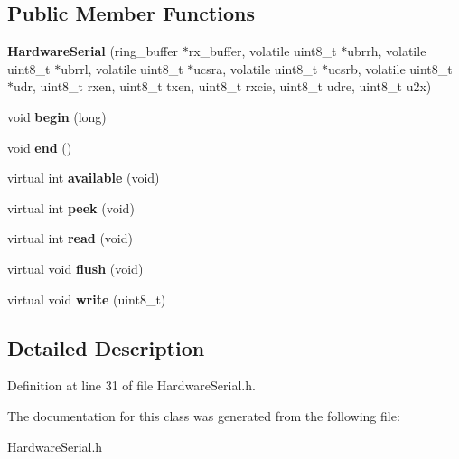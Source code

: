\subsection*{\-Public \-Member \-Functions}
\begin{DoxyCompactItemize}
\item 
\hypertarget{classHardwareSerial_adf3e7a7ac1006aeb934b506d502859b1}{
{\bfseries \-Hardware\-Serial} (ring\-\_\-buffer $\ast$rx\-\_\-buffer, volatile uint8\-\_\-t $\ast$ubrrh, volatile uint8\-\_\-t $\ast$ubrrl, volatile uint8\-\_\-t $\ast$ucsra, volatile uint8\-\_\-t $\ast$ucsrb, volatile uint8\-\_\-t $\ast$udr, uint8\-\_\-t rxen, uint8\-\_\-t txen, uint8\-\_\-t rxcie, uint8\-\_\-t udre, uint8\-\_\-t u2x)}
\label{classHardwareSerial_adf3e7a7ac1006aeb934b506d502859b1}

\item 
\hypertarget{classHardwareSerial_acea43a2b9c704ddf0a7c5f8b7859816c}{
void {\bfseries begin} (long)}
\label{classHardwareSerial_acea43a2b9c704ddf0a7c5f8b7859816c}

\item 
\hypertarget{classHardwareSerial_a0f86c41f580e04bdf30ea00e9014eacd}{
void {\bfseries end} ()}
\label{classHardwareSerial_a0f86c41f580e04bdf30ea00e9014eacd}

\item 
\hypertarget{classHardwareSerial_a60e2bb4a3f40cfaf94601cd4e3333f43}{
virtual int {\bfseries available} (void)}
\label{classHardwareSerial_a60e2bb4a3f40cfaf94601cd4e3333f43}

\item 
\hypertarget{classHardwareSerial_a69b3cfa7d35cc8102fe14e302034f194}{
virtual int {\bfseries peek} (void)}
\label{classHardwareSerial_a69b3cfa7d35cc8102fe14e302034f194}

\item 
\hypertarget{classHardwareSerial_a760f254188b4687f5a8a74f4ddd3c83d}{
virtual int {\bfseries read} (void)}
\label{classHardwareSerial_a760f254188b4687f5a8a74f4ddd3c83d}

\item 
\hypertarget{classHardwareSerial_a33a5d5c5ffa184e2c303a21152fa2abe}{
virtual void {\bfseries flush} (void)}
\label{classHardwareSerial_a33a5d5c5ffa184e2c303a21152fa2abe}

\item 
\hypertarget{classHardwareSerial_aed5cd72cb685534be43eb1e87468ae8c}{
virtual void {\bfseries write} (uint8\-\_\-t)}
\label{classHardwareSerial_aed5cd72cb685534be43eb1e87468ae8c}

\end{DoxyCompactItemize}


\subsection{\-Detailed \-Description}


\-Definition at line 31 of file \-Hardware\-Serial.\-h.



\-The documentation for this class was generated from the following file\-:\begin{DoxyCompactItemize}
\item 
\-Hardware\-Serial.\-h\end{DoxyCompactItemize}
